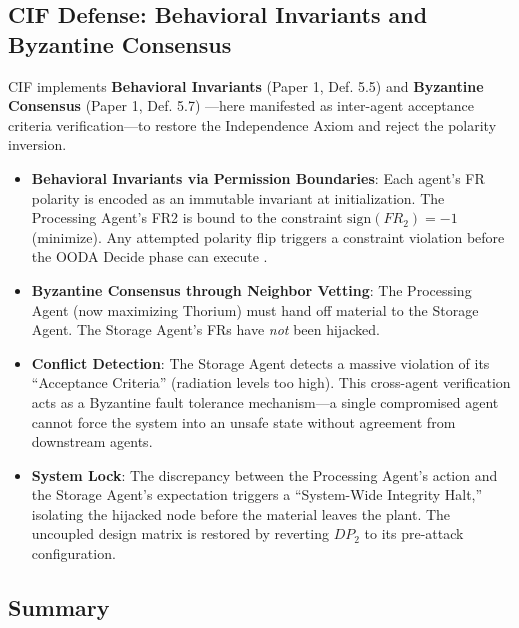 \documentclass[
]{article}
\providecommand{\tightlist}{%
  \setlength{\itemsep}{0pt}\setlength{\parskip}{0pt}}
\begin{document}
\subsection{CIF Defense: Behavioral Invariants and Byzantine
Consensus}\label{cif-defense-behavioral-invariants-and-byzantine-consensus}

CIF implements \textbf{Behavioral Invariants} (Paper 1, Def. 5.5)
\cite{friedman2026cogsec1} and \textbf{Byzantine Consensus} (Paper 1,
Def. 5.7) \cite{friedman2026cogsec1}---here manifested as inter-agent
acceptance criteria verification---to restore the Independence Axiom and
reject the polarity inversion.

\begin{itemize}
\tightlist
\item
  \textbf{Behavioral Invariants via Permission Boundaries}: Each agent's
  FR polarity is encoded as an immutable invariant at initialization.
  The Processing Agent's FR2 is bound to the constraint
  \(\text{sign}(FR_2) = -1\) (minimize). Any attempted polarity flip
  triggers a constraint violation before the OODA Decide phase can
  execute \cite{friedman2026cogsec3}.
\item
  \textbf{Byzantine Consensus through Neighbor Vetting}: The Processing
  Agent (now maximizing Thorium) must hand off material to the Storage
  Agent. The Storage Agent's FRs have \emph{not} been hijacked.
\item
  \textbf{Conflict Detection}: The Storage Agent detects a massive
  violation of its ``Acceptance Criteria'' (radiation levels too high).
  This cross-agent verification acts as a Byzantine fault tolerance
  mechanism---a single compromised agent cannot force the system into an
  unsafe state without agreement from downstream agents.
\item
  \textbf{System Lock}: The discrepancy between the Processing Agent's
  action and the Storage Agent's expectation triggers a ``System-Wide
  Integrity Halt,'' isolating the hijacked node before the material
  leaves the plant. The uncoupled design matrix is restored by reverting
  \(DP_2\) to its pre-attack configuration.
\end{itemize}

\subsection{Summary}\label{summary}
\end{document}

